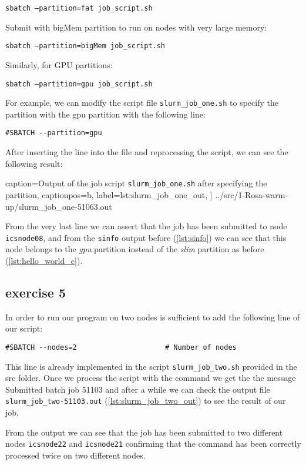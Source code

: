 \quad\quad\texttt{sbatch --partition=fat job\_script.sh}

Submit with bigMem partition to run on nodes with very large memory:

\quad\quad\texttt{sbatch --partition=bigMem job\_script.sh}

Similarly, for GPU partitions:

\quad\quad\texttt{sbatch --partition=gpu job\_script.sh}

For example, we can modify the script file \texttt{slurm\_job\_one.sh} to specify the partition with the gpu partition with the following line:
\begin{verbatim}
#SBATCH --partition=gpu
\end{verbatim}

After inserting the line into the file and reprocessing the script, we can see the following result:


    caption={Output of the job script \texttt{slurm\_job\_one.sh} after specifying the partition},
    captionpos=b,
    label={lst:slurm_job_one_out},
]
{../src/1-Rosa-warm-up/slurm_job_one-51063.out}

From the very last line we can assert that the job has been submitted to node \texttt{icsnode08}, and from the \texttt{sinfo} output before (\ref{lst:sinfo}) we can see that this node belongs to the \textit{gpu} partition instead of the \textit{slim} partition as before (\ref{lst:hello_world_c}).

\subsection{exercise 5}

In order to run our program on two nodes is sufficient to add the following line of our script:
\begin{verbatim}
#SBATCH --nodes=2                     # Number of nodes
\end{verbatim}
This line is already implemented in the script \texttt{slurm\_job\_two.sh} provided in the src folder. Once we process the script with the command we get the the message Submitted batch job 51103 and after a while we can check the output file \texttt{slurm\_job\_two-51103.out} (\ref{lst:slurm_job_two_out}) to see the result of our job.



From the output we can see that the job has been submitted to two different nodes \texttt{icsnode22} and \texttt{icsnode21} confirming that the command has been correctly processed twice on two different nodes.
